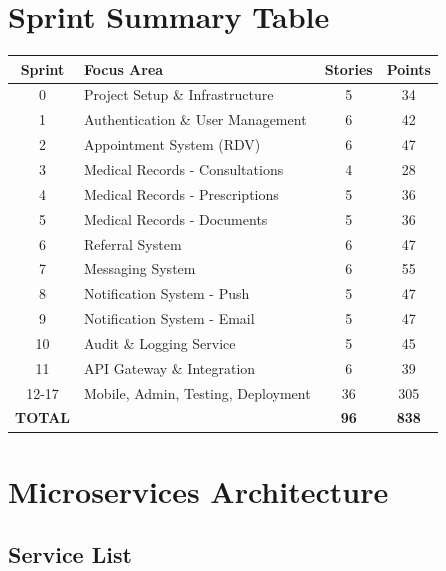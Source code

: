 \documentclass[11pt,a4paper]{article}
\begin{document}
\newpage

\appendix

\section{Sprint Summary Table}

\begin{longtable}{|c|l|c|c|}
\hline
\textbf{Sprint} & \textbf{Focus Area} & \textbf{Stories} & \textbf{Points} \\
\hline
0 & Project Setup \& Infrastructure & 5 & 34 \\
1 & Authentication \& User Management & 6 & 42 \\
2 & Appointment System (RDV) & 6 & 47 \\
3 & Medical Records - Consultations & 4 & 28 \\
4 & Medical Records - Prescriptions & 5 & 36 \\
5 & Medical Records - Documents & 5 & 36 \\
6 & Referral System & 6 & 47 \\
7 & Messaging System & 6 & 55 \\
8 & Notification System - Push & 5 & 47 \\
9 & Notification System - Email & 5 & 47 \\
10 & Audit \& Logging Service & 5 & 45 \\
11 & API Gateway \& Integration & 6 & 39 \\
12-17 & Mobile, Admin, Testing, Deployment & 36 & 305 \\
\hline
\textbf{TOTAL} & & \textbf{96} & \textbf{838} \\
\hline
\end{longtable}

\section{Microservices Architecture}

\subsection{Service List}
\end{document}
